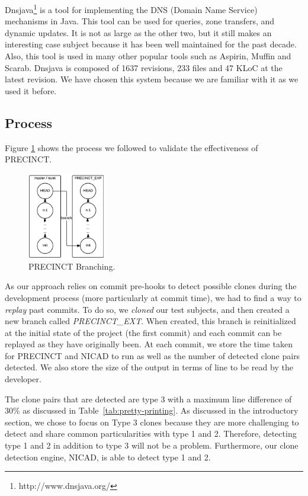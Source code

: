 \documentclass[conference]{IEEEtran}
\begin{document}
Dnsjava\footnote{http://www.dnsjava.org/} is a tool for implementing the DNS (Domain Name Service) mechanisms in Java.
This tool can be used for queries, zone transfers, and dynamic updates.
It is not as large as the other two, but it still makes an interesting case subject because it has been well maintained for the past decade. Also, this tool is used in many other popular tools such as Aspirin, Muffin and
Scarab. Dnsjava is composed of 1637 revisions, 233 files and 47 KLoC at the latest revision.
We have chosen this system because we are familiar with it as we used it before\cite{Nayrolles2015c}.

\subsection{Process}
\label{sub:Process}


Figure \ref{fig:precinct-branching} shows the process we followed to validate the effectiveness of PRECINCT.

\begin{figure}
  \centering
    \includegraphics[width=0.3\textwidth]{media/branch.png}
    \caption{PRECINCT Branching.\label{fig:precinct-branching}}
\end{figure}

As our approach relies on commit pre-hooks to detect possible clones during the development process (more particularly at commit time), we had to find a way to \textit{replay} past commits. To do so, we  \textit{cloned} our test subjects, and then created a new branch called \textit{PRECINCT\_EXT}.
When created, this branch is reinitialized at the initial state of the project (the first commit) and each commit can be replayed as they have originally been. At each commit, we store the time taken for PRECINCT and NICAD to run as well as the number of detected clone pairs detected.
We also store the size of the output in terms of line to be read by the developer.

The clone pairs that are detected are type 3 with a maximum line difference of 30\% as discussed in Table~\ref{tab:pretty-printing}.
As discussed in the introductory section, we chose to focus on Type 3 clones because they are more challenging to detect and share common particularities with type 1 and 2.
Therefore, detecting type 1 and 2 in addition to type 3 will not be a problem.
Furthermore, our clone detection engine, NICAD, is able to detect type 1 and 2.
\end{document}

